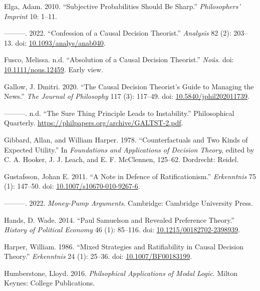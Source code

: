 \documentclass[
  11pt,
  letterpaper,
  DIV=11,
  numbers=noendperiod,
  twoside]{scrartcl}
\newlength{\cslhangindent}
\newenvironment{CSLReferences}[2] %
 {\begin{list}{}{%
  \setlength{\itemindent}{0pt}
  \setlength{\leftmargin}{0pt}
  \setlength{\parsep}{0pt}
  \ifodd #1
   \setlength{\leftmargin}{\cslhangindent}
   \setlength{\itemindent}{-1\cslhangindent}
  \fi
  \setlength{\itemsep}{#2\baselineskip}}}
 {\end{list}}
\begin{document}
\begin{CSLReferences}{1}{0}
Elga, Adam. 2010. {``Subjective Probabilities Should Be Sharp.''}
\emph{Philosophers' Imprint} 10: 1--11.

---------. 2022. {``Confession of a Causal Decision Theorist.''}
\emph{Analysis} 82 (2): 203--13. doi:
\href{https://doi.org/10.1093/analys/anab040}{10.1093/analys/anab040}.

Fusco, Melissa. n.d. {``Absolution of a Causal Decision Theorist.''}
\emph{No{û}s}. doi:
\href{https://doi.org/10.1111/nous.12459}{10.1111/nous.12459}. Early
view.

Gallow, J. Dmitri. 2020. {``The Causal Decision Theorist's Guide to
Managing the News.''} \emph{The Journal of Philosophy} 117 (3): 117--49.
doi:
\href{https://doi.org/10.5840/jphil202011739}{10.5840/jphil202011739}.

---------. n.d. {``The Sure Thing Principle Leads to Instability.''}
Philosophical Quarterly.
\url{https://philpapers.org/archive/GALTST-2.pdf}.

Gibbard, Allan, and William Harper. 1978. {``Counterfactuals and Two
Kinds of Expected Utility.''} In \emph{Foundations and Applications of
Decision Theory}, edited by C. A. Hooker, J. J. Leach, and E. F.
McClennen, 125--62. Dordrecht: Reidel.

Gustafsson, Johan E. 2011. {``A Note in Defence of Ratificationism.''}
\emph{Erkenntnis} 75 (1): 147--50. doi:
\href{https://doi.org/10.1007/s10670-010-9267-6}{10.1007/s10670-010-9267-6}.

---------. 2022. \emph{Money-Pump Arguments}. Cambridge: Cambridge
University Press.

Hands, D. Wade. 2014. {``{Paul Samuelson and Revealed Preference
Theory}.''} \emph{History of Political Economy} 46 (1): 85--116. doi:
\href{https://doi.org/10.1215/00182702-2398939}{10.1215/00182702-2398939}.

Harper, William. 1986. {``Mixed Strategies and Ratifiability in Causal
Decision Theory.''} \emph{Erkenntnis} 24 (1): 25--36. doi:
\href{https://doi.org/10.1007/BF00183199}{10.1007/BF00183199}.

Humberstone, Lloyd. 2016. \emph{Philsophical Applications of Modal
Logic}. Milton Keynes: College Publications.


\end{CSLReferences}
\end{document}
